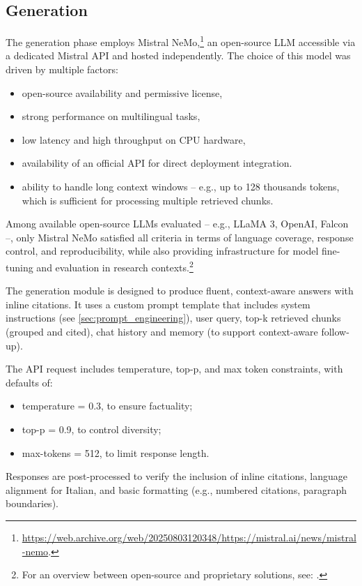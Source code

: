 \begin{spacing}{1.5}
\section{Generation}
The generation phase employs Mistral NeMo,\footnote{\url{https://web.archive.org/web/20250803120348/https://mistral.ai/news/mistral-nemo}.\nocite{noauthor_mistral_2025}} an open-source LLM accessible via a dedicated Mistral API and hosted independently. The choice of this model was driven by multiple factors:
\begin{itemize}
      \item open-source availability and permissive license,
      \item strong performance on multilingual tasks,
      \item low latency and high throughput on CPU hardware,
      \item availability of an official API for direct deployment integration.
      \item ability to handle long context windows -- e.g., up to 128 thousands tokens, which is sufficient for processing multiple retrieved chunks.
\end{itemize}

Among available open-source LLMs evaluated -- e.g., LLaMA 3, OpenAI, Falcon --, only Mistral NeMo satisfied all criteria in terms of language coverage, response control, and reproducibility, while also providing infrastructure for model fine-tuning and evaluation in research contexts.\footnote{For an overview between open-source and proprietary solutions, see: \textcite{noauthor_open_2025}.}

The generation module is designed to produce fluent, context-aware answers with inline citations. It uses a custom prompt template that includes system instructions (see \autoref{sec:prompt_engineering}), user query, top-k retrieved chunks (grouped and cited), chat history and memory (to support context-aware follow-up).

The API request includes temperature, top-p, and max token constraints, with defaults of:
\begin{itemize}
      \item temperature = 0.3, to ensure factuality;
      \item top-p = 0.9, to control diversity;
      \item max-tokens = 512, to limit response length.
\end{itemize}

Responses are post-processed to verify the inclusion of inline citations, language alignment for Italian, and basic formatting (e.g., numbered citations, paragraph boundaries).


\end{spacing}
